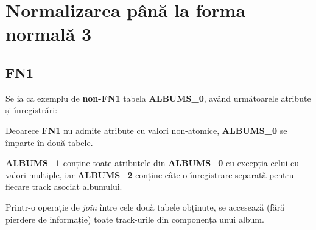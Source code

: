 \documentclass[a4paper, oneside, 12pt]{article}
\newcommand{\rowstyle}[1]{\gdef\currentrowstyle{#1}%
  #1\ignorespaces
}
\begin{document}
\begin{center}



\end{center}

\section{Normalizarea până la forma normală 3}

\subsection{FN1}

Se ia ca exemplu de \textbf{non-FN1} tabela \textbf{ALBUMS\_0}, având următoarele atribute și înregistrări:


\begin{table}[h]
\centering
\caption*{Tabela \textbf{ALBUMS\_0}:}
\end{table}

Deoarece \textbf{FN1} nu admite atribute cu valori non-atomice,
\textbf{ALBUMS\_0} se împarte în două tabele.

\textbf{ALBUMS\_1} conține
toate atributele din \textbf{ALBUMS\_0} cu excepția celui cu valori multiple,
iar \textbf{ALBUMS\_2} conține câte o înregistrare separată pentru fiecare
track asociat albumului.

Printr-o operație de \emph{join} între cele două tabele obținute, se accesează
(fără pierdere de informație) toate track-urile din componența unui album.



\begin{table}[h]
\centering
\caption*{Tabela \textbf{ALBUMS\_1}:}
\end{table}
\end{document}
